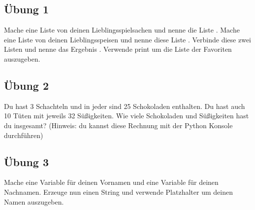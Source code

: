 \subsection*{Übung 1}
Mache eine Liste von deinen Lieblingsspielsachen und nenne die Liste . Mache eine Liste von deinen Lieblingsspeisen und nenne diese Liste . Verbinde diese zwei Listen und nenne das Ergebnis . Verwende print um die Liste der Favoriten auszugeben.

\subsection*{Übung 2}
Du hast 3 Schachteln und in jeder sind 25 Schokoladen enthalten. Du hast auch 10 Tüten mit jeweils 32 Süßigkeiten. Wie viele Schokoladen und Süßigkeiten hast du insgesamt? (Hinweis: du kannst diese Rechnung mit der Python Konsole durchführen)

\subsection*{Übung 3}
Mache eine Variable für deinen Vornamen und eine Variable für deinen Nachnamen. Erzeuge nun einen String und verwende Platzhalter um deinen Namen auszugeben.

\newpage
